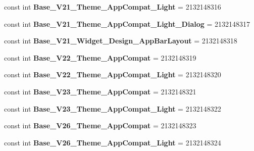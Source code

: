 \begin{DoxyCompactItemize}
const int {\bfseries Base\+\_\+\+V21\+\_\+\+Theme\+\_\+\+App\+Compat\+\_\+\+Light} = 2132148316
\item 
\mbox{\label{classst_delivery_1_1_resource_1_1_style_ae1332e0f21d2f66d49f1d7fd0cdde7e4}} 
const int {\bfseries Base\+\_\+\+V21\+\_\+\+Theme\+\_\+\+App\+Compat\+\_\+\+Light\+\_\+\+Dialog} = 2132148317
\item 
\mbox{\label{classst_delivery_1_1_resource_1_1_style_a13e9fe339d56f12f3ea4697194ad599d}} 
const int {\bfseries Base\+\_\+\+V21\+\_\+\+Widget\+\_\+\+Design\+\_\+\+App\+Bar\+Layout} = 2132148318
\item 
\mbox{\label{classst_delivery_1_1_resource_1_1_style_a88f134e9a540cce49cc73c0c86f73605}} 
const int {\bfseries Base\+\_\+\+V22\+\_\+\+Theme\+\_\+\+App\+Compat} = 2132148319
\item 
\mbox{\label{classst_delivery_1_1_resource_1_1_style_a9d312f2e2a6d3a989356c18873552e11}} 
const int {\bfseries Base\+\_\+\+V22\+\_\+\+Theme\+\_\+\+App\+Compat\+\_\+\+Light} = 2132148320
\item 
\mbox{\label{classst_delivery_1_1_resource_1_1_style_a270c181a69a49d07637164a060f6eba3}} 
const int {\bfseries Base\+\_\+\+V23\+\_\+\+Theme\+\_\+\+App\+Compat} = 2132148321
\item 
\mbox{\label{classst_delivery_1_1_resource_1_1_style_ad037637b3e1be85a6183fa69c7482fdb}} 
const int {\bfseries Base\+\_\+\+V23\+\_\+\+Theme\+\_\+\+App\+Compat\+\_\+\+Light} = 2132148322
\item 
\mbox{\label{classst_delivery_1_1_resource_1_1_style_aaffefc3befa22fe9ad7b7dae725e66a1}} 
const int {\bfseries Base\+\_\+\+V26\+\_\+\+Theme\+\_\+\+App\+Compat} = 2132148323
\item 
\mbox{\label{classst_delivery_1_1_resource_1_1_style_ae29146ff38909cdda8bbcc4f806f6212}} 
const int {\bfseries Base\+\_\+\+V26\+\_\+\+Theme\+\_\+\+App\+Compat\+\_\+\+Light} = 2132148324

\end{DoxyCompactItemize}
